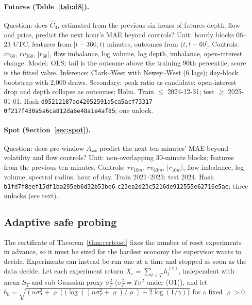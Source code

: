 \documentclass[12pt]{article}
\theoremstyle{definition}
\theoremstyle{remark}
\begin{document}
\paragraph{Futures (Table~\ref{tab:d8}).} Question: does $\hat C_3$, estimated from the previous six hours of futures depth, flow and price, predict the next hour's MAE beyond controls? Unit: hourly blocks 06--23 UTC, features from $[t-360,t)$ minutes, outcomes from $(t,t+60]$. Controls: $rv_{60}$, $rv_{360}$, $|r_{60}|$, flow imbalance, log volume, log depth, imbalance, open-interest change. Model: OLS; tail is the outcome above the training 90th percentile; score is the fitted value. Inference: Clark--West with Newey--West (6 lags); day-block bootstrap with 2,000 draws. Secondary: peak ratio as candidate; open-interest drop and depth collapse as outcomes; Holm. Train $\le$ 2024-12-31; test $\ge$ 2025-01-01. Hash \texttt{d95212187ae42052591a5ca5acf73317} \texttt{0f217f430a5a6ca812da6e48a1e4af85}; one unlock.

\paragraph{Spot (Section~\ref{sec:spot}).} Question: does pre-window $A_{xx}$ predict the next ten minutes' MAE beyond volatility and flow controls? Unit: non-overlapping 30-minute blocks; features from the previous ten minutes. Controls: $rv_{10m}$, $rv_{60m}$, $|r_{10m}|$, flow imbalance, log volume, spectral radius, hour of day. Train 2021--2023; test 2024. Hash \texttt{b1fd7f8eef15df1ba295eb6d32b53be6} \texttt{c23ea2d23c5216de912555e62716e5ae}; three unlocks (see text).

\subsection{Adaptive safe probing}\label{app:probe}
The certificate of Theorem~\ref{thm:certcost} fixes the number of reset experiments in advance, so it must be sized for the hardest economy the supervisor wants to decide. Experiments can instead be run one at a time and stopped as soon as the data decide. Let each experiment return $X_e=\sum_{t<T}h^{(e)}_t$, independent with mean $S_T$ and sub-Gaussian proxy $\sigma_T^2$ ($\sigma_T^2=T\sigma^2$ under (O1)), and let $b_n=\sqrt{(n\sigma_T^2+\varrho)\bigl(\log((n\sigma_T^2+\varrho)/\varrho)+2\log(1/\gamma)\bigr)}$ for a fixed $\varrho>0$.
\end{document}
